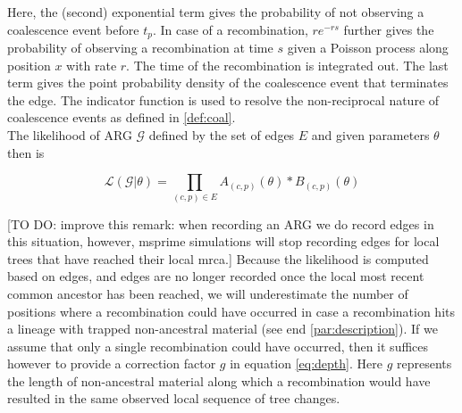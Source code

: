 \documentclass{article}
\begin{document}
Here, the (second) exponential term gives the probability of not observing a 
coalescence event before $t_p$. In case of a recombination, $re^{-rs}$ further 
gives the probability of observing a recombination 
at time $s$ given a Poisson process along position $x$ with rate $r$. The 
time of the recombination is integrated out.
The last term gives the point probability density of the coalescence event 
that terminates the edge. The indicator function is used to resolve 
the non-reciprocal nature of coalescence events as defined in \ref{def:coal}.\\

The likelihood of ARG $\mathcal{G}$ defined by the set of edges $E$ and
given parameters $\theta$ then is

\begin{equation}\label{eq:full-lik}
\mathcal{L}(\mathcal{G}|\theta) = \prod_{(c, p) \in E} A_{(c, p)}(\theta) * B_{(c, p)}(\theta)
\end{equation}


[TO DO: improve this remark: when recording an ARG we do record edges in this situation,
however, msprime simulations will stop recording edges for local trees that have reached 
their local mrca.] 
Because the likelihood is computed based on edges,
and edges are no longer recorded once the local most recent common ancestor 
has been reached, we will underestimate the number of positions where 
a recombination could have occurred in case a recombination hits a 
lineage with trapped non-ancestral material (see end \ref{par:description}). 
If we assume that only a single recombination could have  
occurred, then it suffices however to provide a correction factor $g$ in equation
\ref{eq:depth}. Here $g$ represents the 
length of non-ancestral material along which a recombination would have resulted  
in the same observed local sequence of tree changes.\\
\end{document}
